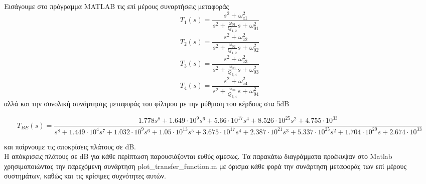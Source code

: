 \documentclass{article}
\begin{document}
{{\large{}
Εισάγουμε στο  πρόγραμμα MATLAB τις επί μέρους συναρτήσεις μεταφοράς
\begin{equation*}
\boxed{
T_1(s) =  \frac{s^2 + ω_{z1}^2}{s^2 + \frac{ω_{01}}{Q_{1,2}}s + ω_{01}^2} }
\end{equation*}
\begin{equation*}
\boxed{
T_2(s) =   \frac{s^2 + ω_{z2}^2}{s^2 + \frac{ω_{02}}{Q_{1,2}}s + ω_{02}^2} }
\end{equation*}
 \begin{equation*}
\boxed{
T_3(s) =     \frac{s^2 + ω_{z3}^2}{s^2 + \frac{ω_{03}}{Q_{3,4}}s + ω_{03}^2} }
\end{equation*}
\begin{equation*}
\boxed{
T_4(s) =     \frac{s^2 + ω_{z4}^2}{s^2 + \frac{ω_{04}}{Q_{3,4}}s + ω_{04}^2} }
\end{equation*}
αλλά και την συνολική συνάρτησης μεταφοράς του φίλτρου με την ρύθμιση του κέρδους στα 5dB
 \scriptsize{}
\begin{changemargin}{-2.3cm}{0.5cm} 
\begin{equation*}
T_{BE}(s) = \frac{1.778 s^8 + 1.649 \cdot 10^9 s^6 + 5.66 \cdot10^{17} s^4 + 8.526 \cdot10^{25} s^2 + 4.755 \cdot 10^{33}}{ s^8 + 1.449 \cdot 10^4 s^7 + 1.032\cdot 10^9 s^6 + 1.05\cdot 10^{13} s^5 + 3.675\cdot 10^{17} s^4 + 2.387\cdot 10^{21} s^3 + 5.337\cdot 10^{25} s^2 + 1.704\cdot 10^{29} s + 2.674\cdot 10^{33}}
\end{equation*}

\end{changemargin}

\large{}
και παίρνουμε τις αποκρίσεις πλάτους σε dB. \\ Η απόκρισεις πλάτους σε dB για κάθε περίπτωση παρουσιάζονται ευθύς αμεσως. Τα παρακάτω διαγράμματα προέκυψαν στο Matlab χρησιμοποιώντας την παρεχόμενη συνάρτηση plot\_transfer\_function.m με όρισμα κάθε φορά την συνάρτηση μεταφοράς των επί μέρους συστημάτων, καθώς και τις κρίσιμες συχνότητες αυτών. 

\newpage

\newpage
}}
\end{document}
